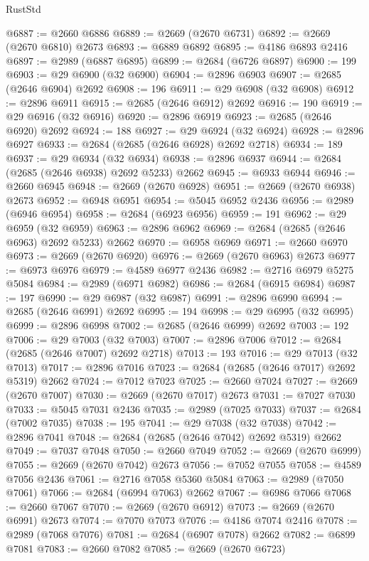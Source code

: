\begin{lexlean}{RustStd}
\begin{coremodule}
@6887 := @2660 @6886
@6889 := @2669 (@2670 @6731)
@6892 := @2669 (@2670 @6810) @2673
@6893 := @6889 @6892
@6895 := @4186 @6893 @2416
@6897 := @2989 (@6887 @6895)
@6899 := @2684 (@6726 @6897)
@6900 := 199
@6903 := @29 @6900 (@32 @6900)
@6904 := @2896 @6903
@6907 := @2685 (@2646 @6904) @2692
@6908 := 196
@6911 := @29 @6908 (@32 @6908)
@6912 := @2896 @6911
@6915 := @2685 (@2646 @6912) @2692
@6916 := 190
@6919 := @29 @6916 (@32 @6916)
@6920 := @2896 @6919
@6923 := @2685 (@2646 @6920) @2692
@6924 := 188
@6927 := @29 @6924 (@32 @6924)
@6928 := @2896 @6927
@6933 := @2684 (@2685 (@2646 @6928) @2692 @2718)
@6934 := 189
@6937 := @29 @6934 (@32 @6934)
@6938 := @2896 @6937
@6944 := @2684 (@2685 (@2646 @6938) @2692 @5233) @2662
@6945 := @6933 @6944
@6946 := @2660 @6945
@6948 := @2669 (@2670 @6928)
@6951 := @2669 (@2670 @6938) @2673
@6952 := @6948 @6951
@6954 := @5045 @6952 @2436
@6956 := @2989 (@6946 @6954)
@6958 := @2684 (@6923 @6956)
@6959 := 191
@6962 := @29 @6959 (@32 @6959)
@6963 := @2896 @6962
@6969 := @2684 (@2685 (@2646 @6963) @2692 @5233) @2662
@6970 := @6958 @6969
@6971 := @2660 @6970
@6973 := @2669 (@2670 @6920)
@6976 := @2669 (@2670 @6963) @2673
@6977 := @6973 @6976
@6979 := @4589 @6977 @2436
@6982 := @2716 @6979 @5275 @5084
@6984 := @2989 (@6971 @6982)
@6986 := @2684 (@6915 @6984)
@6987 := 197
@6990 := @29 @6987 (@32 @6987)
@6991 := @2896 @6990
@6994 := @2685 (@2646 @6991) @2692
@6995 := 194
@6998 := @29 @6995 (@32 @6995)
@6999 := @2896 @6998
@7002 := @2685 (@2646 @6999) @2692
@7003 := 192
@7006 := @29 @7003 (@32 @7003)
@7007 := @2896 @7006
@7012 := @2684 (@2685 (@2646 @7007) @2692 @2718)
@7013 := 193
@7016 := @29 @7013 (@32 @7013)
@7017 := @2896 @7016
@7023 := @2684 (@2685 (@2646 @7017) @2692 @5319) @2662
@7024 := @7012 @7023
@7025 := @2660 @7024
@7027 := @2669 (@2670 @7007)
@7030 := @2669 (@2670 @7017) @2673
@7031 := @7027 @7030
@7033 := @5045 @7031 @2436
@7035 := @2989 (@7025 @7033)
@7037 := @2684 (@7002 @7035)
@7038 := 195
@7041 := @29 @7038 (@32 @7038)
@7042 := @2896 @7041
@7048 := @2684 (@2685 (@2646 @7042) @2692 @5319) @2662
@7049 := @7037 @7048
@7050 := @2660 @7049
@7052 := @2669 (@2670 @6999)
@7055 := @2669 (@2670 @7042) @2673
@7056 := @7052 @7055
@7058 := @4589 @7056 @2436
@7061 := @2716 @7058 @5360 @5084
@7063 := @2989 (@7050 @7061)
@7066 := @2684 (@6994 @7063) @2662
@7067 := @6986 @7066
@7068 := @2660 @7067
@7070 := @2669 (@2670 @6912)
@7073 := @2669 (@2670 @6991) @2673
@7074 := @7070 @7073
@7076 := @4186 @7074 @2416
@7078 := @2989 (@7068 @7076)
@7081 := @2684 (@6907 @7078) @2662
@7082 := @6899 @7081
@7083 := @2660 @7082
@7085 := @2669 (@2670 @6723)

\end{coremodule}
\end{lexlean}
